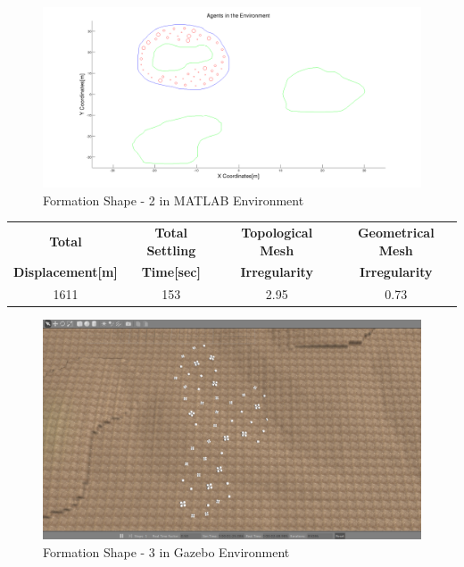 \begin{figure}[H]
\caption{Formation Shape - 2 in MATLAB Environment}
\centerline{\includegraphics[scale = 0.32]{2}}
\end{figure} 
		 
\begin{center}
 \label{perf_shape2} 
\begin{tabular}{||c| c |c |c ||}
		 		
\hline
\textbf{Total}  & \textbf{Total Settling} & \textbf{Topological Mesh} & \textbf{Geometrical Mesh} \\ \textbf{Displacement[m]} & \textbf{Time[sec]}& \textbf{Irregularity} & \textbf{Irregularity} \\
\hline
1611 & 153 &  2.95& 0.73\\
\hline
\end{tabular}
\end{center}
		 
\begin{figure}[H]
\caption{Formation Shape - 3 in Gazebo Environment}
\centerline{\includegraphics[scale = 0.32]{3_Gazebo}}
\end{figure} 
				 
